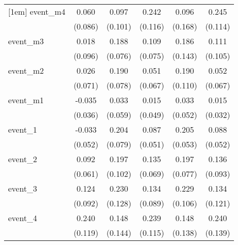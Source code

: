 {\begin{tabular}{l*{5}{c}}
[1em]
event\_m4    &       0.060         &       0.097         &       0.242\sym{*}  &       0.096         &       0.245\sym{*}  \\
            &     (0.086)         &     (0.101)         &     (0.116)         &     (0.168)         &     (0.114)         \\
[1em]
event\_m3    &       0.018         &       0.188\sym{*}  &       0.109         &       0.186         &       0.111         \\
            &     (0.096)         &     (0.076)         &     (0.075)         &     (0.143)         &     (0.105)         \\
[1em]
event\_m2    &       0.026         &       0.190\sym{*}  &       0.051         &       0.190         &       0.052         \\
            &     (0.071)         &     (0.078)         &     (0.067)         &     (0.110)         &     (0.067)         \\
[1em]
event\_m1    &      -0.035         &       0.033         &       0.015         &       0.033         &       0.015         \\
            &     (0.036)         &     (0.059)         &     (0.049)         &     (0.052)         &     (0.032)         \\
[1em]
event\_1     &      -0.033         &       0.204\sym{**} &       0.087         &       0.205\sym{***}&       0.088         \\
            &     (0.052)         &     (0.079)         &     (0.051)         &     (0.053)         &     (0.052)         \\
[1em]
event\_2     &       0.092         &       0.197         &       0.135\sym{*}  &       0.197\sym{*}  &       0.136         \\
            &     (0.061)         &     (0.102)         &     (0.069)         &     (0.077)         &     (0.093)         \\
[1em]
event\_3     &       0.124         &       0.230         &       0.134         &       0.229\sym{*}  &       0.134         \\
            &     (0.092)         &     (0.128)         &     (0.089)         &     (0.106)         &     (0.121)         \\
[1em]
event\_4     &       0.240\sym{*}  &       0.148         &       0.239\sym{*}  &       0.148         &       0.240         \\
            &     (0.119)         &     (0.144)         &     (0.115)         &     (0.138)         &     (0.139)         \\

\end{tabular}}
